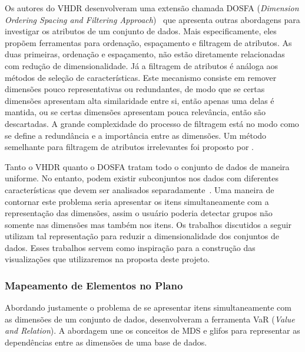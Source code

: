 Os autores do VHDR desenvolveram uma extensão chamada DOSFA
(\emph{Dimension Ordering Spacing and Filtering
Approach})~\cite{DOSFA} que apresenta outras abordagens para
investigar os atributos de um conjunto de dados. Mais
especificamente, eles propõem ferramentas para ordenação,
espaçamento e filtragem de atributos. As duas primeiras,
ordenação e espaçamento, não estão diretamente relacionadas
com redução de dimensionalidade. Já a filtragem de atributos
é análoga aos métodos de seleção de características. Este
mecanismo consiste em remover dimensões pouco
representativas ou redundantes, de modo que se certas
dimensões apresentam alta similaridade entre si, então
apenas uma delas é mantida, ou se certas dimensões
apresentam pouca relevância, então são descartadas. A grande
complexidade do processo de filtragem está no modo como se
define a redundância e a importância entre as dimensões. Um
método semelhante para filtragem de atributos irrelevantes
foi proposto por \citet{Artero2006}.

Tanto o VHDR quanto o DOSFA tratam todo o conjunto de dados
de maneira uniforme. No entanto, podem existir subconjuntos
nos dados com diferentes características que devem ser
analisados separadamente~\cite{May2011}. Uma maneira de
contornar este problema seria apresentar os itens
simultaneamente com a representação das dimensões, assim o
usuário poderia detectar grupos não somente nas dimensões
mas também nos itens. Os trabalhos discutidos a seguir
utilizam tal representação para reduzir a dimensionalidade
dos conjuntos de dados. Esses trabalhos servem como
inspiração para a construção das visualizações que
utilizaremos na proposta deste projeto.  

\subsubsection{Mapeamento de Elementos no Plano}

Abordando justamente o problema de se apresentar itens
simultaneamente com as dimensões de um conjunto de dados,
\citet{Yang2004} desenvolveram a ferramenta VaR (\emph{Value and
Relation}). A abordagem une os conceitos de MDS e glifos para
representar as dependências entre as dimensões de uma base
de dados. 

